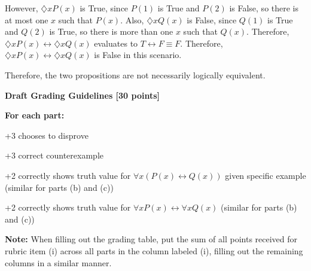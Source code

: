 \documentclass[12pt]{exam}
\begin{document}
\begin{solution}
\begin{qparts}
However, $\diamondsuit x P(x)$ is True, since $P(1)$ is True and $P(2)$ is False, so there is at most one $x$ such that $P(x)$. Also, $\diamondsuit x Q(x)$ is False, since $Q(1)$ is True and $Q(2)$ is True, so there is more than one $x$ such that $Q(x)$. Therefore, $\diamondsuit x P(x) \leftrightarrow \diamondsuit x Q(x)$ evaluates to $T \leftrightarrow F \equiv F$. Therefore, $\diamondsuit x P(x) \leftrightarrow \diamondsuit x Q(x)$ is False in this scenario.

Therefore, the two propositions are not necessarily logically equivalent.
\end{qparts}

\textbf{Draft Grading Guidelines [30 points]}

\textbf{For each part:}
\begin{gwguidelines}
    \item +3 chooses to disprove
    \item +3 correct counterexample
    \item +2 correctly shows truth value for $\forall x (P(x)\leftrightarrow Q(x))$ given specific example (similar for parts (b) and (c))
    \item +2 correctly shows truth value for $\forall x P(x) \leftrightarrow \forall x Q(x)$ (similar for parts (b) and (c))
\end{gwguidelines}
\textbf{Note:} When filling out the grading table, put the sum of all points received for rubric item (i) across all parts in the column labeled (i), filling out the remaining columns in a similar manner.
\end{solution}
\end{document}
